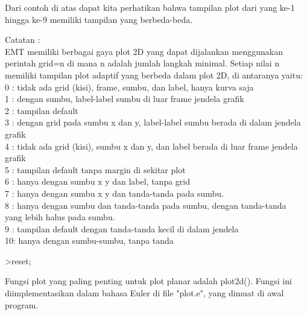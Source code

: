 \documentclass{article}
\begin{document}
\begin{eulernotebook}
\begin{eulercomment}
\begin{eulercomment}
\begin{eulercomment}
\begin{eulercomment}
\begin{eulercomment}
\begin{eulercomment}
\begin{eulercomment}
Dari contoh di atas dapat kita perhatikan bahwa tampilan plot dari
yang ke-1 hingga ke-9 memiliki tampilan yang berbeda-beda.

Catatan : \\
EMT memiliki berbagai gaya plot 2D yang dapat dijalankan menggunakan
perintah grid=n di mana n adalah jumlah langkah minimal. Setiap nilai
n memiliki tampilan plot adaptif yang berbeda dalam plot 2D, di
antaranya yaitu:\\
0 : tidak ada grid (kisi), frame, sumbu, dan label, hanya kurva saja\\
1 : dengan sumbu, label-label sumbu di luar frame jendela grafik\\
2 : tampilan default\\
3 : dengan grid pada sumbu x dan y, label-label sumbu berada di dalam
jendela grafik\\
4 : tidak ada grid (kisi), sumbu x dan y, dan label berada di luar
frame jendela grafik\\
5 : tampilan default tanpa margin di sekitar plot\\
6 : hanya dengan sumbu x y dan label, tanpa grid\\
7 : hanya dengan sumbu x y dan tanda-tanda pada sumbu.\\
8 : hanya dengan sumbu dan tanda-tanda pada sumbu, dengan tanda-tanda\\
yang lebih halus pada sumbu.\\
9 : tampilan default dengan tanda-tanda kecil di dalam jendela\\
10: hanya dengan sumbu-sumbu, tanpa tanda
\end{eulercomment}
\begin{eulerprompt}
>reset;
\end{eulerprompt}
\begin{eulercomment}
Fungsi plot yang paling penting untuk plot planar adalah plot2d().
Fungsi ini diimplementasikan dalam bahasa Euler di file "plot.e", yang
dimuat di awal program.


\end{eulercomment}
\end{eulercomment}
\end{eulercomment}
\end{eulercomment}
\end{eulercomment}
\end{eulercomment}
\end{eulercomment}
\end{eulernotebook}
\end{document}
